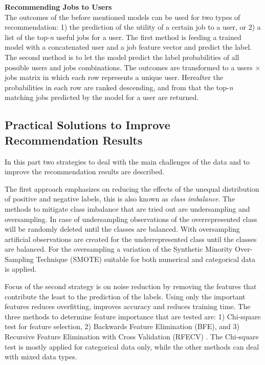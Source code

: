 \noindent
\textbf{Recommending Jobs to Users} \\
The outcomes of the before mentioned models can be used for two types of recommendation: 1) the prediction of the utility of a certain job to a user, or 2) a list of the top-\textit{n} useful jobs for a user.
The first method is feeding a trained model with a concatenated user and a job feature vector and predict the label.
The second method is to let the model predict the label probabilities of all possible users and jobs combinations. 
The outcomes are transformed to a users $\times$ jobs matrix in which each row represents a unique user.
Hereafter the probabilities in each row are ranked descending, and from that the top-\textit{n} matching jobs predicted by the model for a user are returned.


\subsection{Practical Solutions to Improve Recommendation Results}
\label{ssec:psirr}
In this part two strategies to deal with the main challenges of the data and to improve the recommendation results are described.

The first approach emphasizes on reducing the effects of the unequal distribution of positive and negative labels, this is also known as \textit{class imbalance}. 
The methods to mitigate class imbalance that are tried out are undersampling and oversampling. 
In case of undersampling observations of the overrepresented class will be randomly deleted until the classes are balanced. 
With oversampling artificial observations are created for the underrepresented class until the classes are balanced. 
For the oversampling a variation of the Synthetic Minority Over-Sampling Technique (SMOTE) \cite{chawla2002smote} suitable for both numerical and categorical data is applied. 

Focus of the second strategy is on noise reduction by removing the features that contribute the least to the prediction of the labels.
Using only the important features reduces overfitting, improves accuracy and reduces training time. 
The three methods to determine feature importance that are tested are: 1) Chi-square test for feature selection, 2) Backwards Feature Elimination (BFE), and 3) Recursive Feature Elimination with Cross Validation (RFECV) \cite{guyon2002gene}. 
The Chi-square test is mostly applied for categorical data only, while the other methods can deal with mixed data types.
